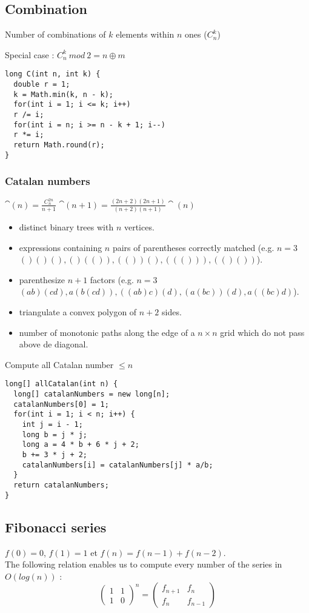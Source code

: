 \subsection{Combination}
Number of combinations of $k$ elements within $n$ ones ($C^k_n$)

Special case : $C^k_n\ mod\ 2 = n\oplus m$
\begin{lstlisting}
long C(int n, int k) {
  double r = 1;
  k = Math.min(k, n - k);
  for(int i = 1; i <= k; i++)
  r /= i;
  for(int i = n; i >= n - k + 1; i--)
  r *= i;
  return Math.round(r);
}
\end{lstlisting}
\subsubsection{Catalan numbers}
$\cat(n) = \frac{C_n^{2n}}{n+1}$ $\cat(n+1) = \frac{(2n+2)(2n+1)}{(n+2)(n+1)}\cat(n)$
\begin{itemize}
  \item distinct binary trees with $n$ vertices.
  \item expressions containing $n$ pairs of parentheses correctly matched (e.g. $n=3$ $()()(),()(()),(())(),((())),(()())$).
  \item parenthesize $n+1$ factors (e.g. $n=3$ $(ab)(cd),a(b(cd)),((ab)c)(d),(a(bc))(d),a((bc)d)$).
  \item triangulate a convex polygon of $n+2$ sides.
  \item number of monotonic paths along the edge of a $n\times n$ grid which do not pass above de diagonal.
\end{itemize}

\vspace{0.5cm}

Compute all Catalan number $\leq n$
\begin{lstlisting}
long[] allCatalan(int n) {
  long[] catalanNumbers = new long[n];
  catalanNumbers[0] = 1;
  for(int i = 1; i < n; i++) {
    int j = i - 1;
    long b = j * j;
    long a = 4 * b + 6 * j + 2;
    b += 3 * j + 2;
    catalanNumbers[i] = catalanNumbers[j] * a/b;
  }
  return catalanNumbers;
}
\end{lstlisting}


\subsection{Fibonacci series}
$f(0) = 0$, $f(1) = 1$ et $f(n) = f(n - 1) + f(n - 2)$.\\
The following relation enables us to compute every number of the series in $O(log(n))$ :\\
$$\begin{pmatrix}
1 & 1\\
1 & 0
\end{pmatrix}^n=\begin{pmatrix}
f_{n+1} & f_n\\
f_n & f_{n-1}
\end{pmatrix}$$
